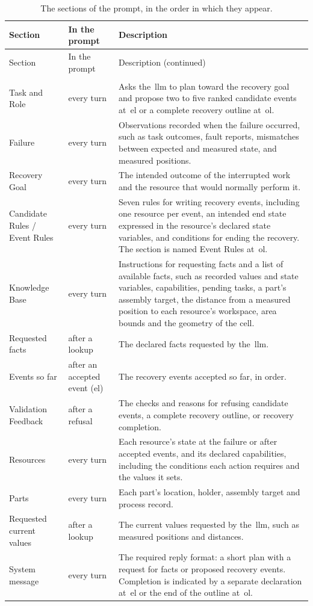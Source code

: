 {\footnotesize\setlength{\tabcolsep}{5pt}
\begin{xltabular}{\linewidth}{@{}>{\raggedright\arraybackslash}p{4.3cm} >{\raggedright\arraybackslash}p{2.4cm} Y@{}}
\toprule
Section & In the prompt & Description \\
\midrule
\endfirsthead
\toprule
Section & In the prompt & Description (continued) \\
\midrule
\endhead
\bottomrule
\endfoot
\bottomrule
\caption{The sections of the prompt, in the order in which they appear.}\label{tab:prompt-blocks}\\
\endlastfoot
Task and Role & every turn & Asks the~\gls{llm} to plan toward the recovery goal and propose two to five ranked candidate events at~\gls{el} or a complete recovery outline at~\gls{ol}. \\
Failure & every turn & Observations recorded when the failure occurred, such as task outcomes, fault reports, mismatches between expected and measured state, and measured positions. \\
Recovery Goal & every turn & The intended outcome of the interrupted work and the resource that would normally perform it. \\
Candidate Rules / Event Rules & every turn & Seven rules for writing recovery events, including one resource per event, an intended end state expressed in the resource's declared state variables, and conditions for ending the recovery. The section is named Event Rules at~\gls{ol}. \\
Knowledge Base & every turn & Instructions for requesting facts and a list of available facts, such as recorded values and state variables, capabilities, pending tasks, a part's assembly target, the distance from a measured position to each resource's workspace, area bounds and the geometry of the cell. \\
Requested facts & after a lookup & The declared facts requested by the~\gls{llm}. \\
Events so far & after an accepted event (\gls{el}) & The recovery events accepted so far, in order. \\
Validation Feedback & after a refusal & The checks and reasons for refusing candidate events, a complete recovery outline, or recovery completion. \\
Resources & every turn & Each resource's state at the failure or after accepted events, and its declared capabilities, including the conditions each action requires and the values it sets. \\
Parts & every turn & Each part's location, holder, assembly target and process record. \\
Requested current values & after a lookup & The current values requested by the~\gls{llm}, such as measured positions and distances. \\
System message & every turn & The required reply format: a short plan with a request for facts or proposed recovery events. Completion is indicated by a separate declaration at~\gls{el} or the end of the outline at~\gls{ol}. \\
\end{xltabular}}

